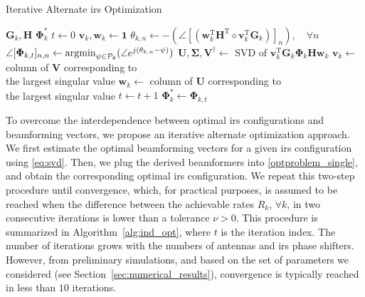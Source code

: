 \begin{algorithm}[t]%
\caption{Iterative Alternate \gls{irs} Optimization}\label{alg:ind_opt}
\begin{algorithmic}[1]%
\Require $\bm{G}_k, \bm{H}$
\Ensure $\bm{\Phi}^*_k$
\State $t\gets 0$
\State $\bm{v}_k, \bm{w}_k \gets \bm{1}$
\Repeat
\State$	\theta_{k, n} \gets -(\angle\left[\left(\bm{w}_k^{\mathrm T}\bm{H}^{\mathrm T}\diamond\bm{v}_k^{\mathrm T}\bm{G}_k\right)\right]_{n}), \quad \forall n$
\State$\angle[\bm{\Phi}_{k, t}]_{n,n} \gets \operatorname*{\arg\!\min}_{\substack{\psi \in \mathcal{P}_{\theta}}}(\angle e^{j(\theta_{k, n}-\psi)})$
\State$\bm{U}, \bm{\Sigma}, \bm{V}^\dagger \gets$  SVD  of $\bm{v}_k^{\mathrm T}\bm{G}_k \bm{\Phi}_k \bm{H}\bm{w}_k $
\State$\bm{v}_k \gets$ column of $\bm{V}$ corresponding to \\\quad\quad the largest singular value
\State$\bm{w}_k \gets$ column of $\bm{U}$ corresponding to \\\quad\quad the largest singular value
\State$t \gets t+1$
\State $\bm{\Phi}^*_k \gets \bm{\Phi}_{k,t}$
\end{algorithmic}\normalsize
\end{algorithm}

To overcome the interdependence between optimal \gls{irs} configurations and beamforming vectors, we propose an iterative alternate optimization approach. We first estimate the optimal beamforming vectors for a given \gls{irs} configuration using \eqref{eq:svd}. Then, we plug the derived beamformers into \eqref{optproblem_single}, and obtain the corresponding optimal \gls{irs} configuration. We repeat this two-step procedure until convergence, which, for practical purposes, is assumed to be reached when the difference between the achievable rates $R_k$, $\forall k$, in two consecutive iterations is lower than a tolerance $\nu>0$. 
This procedure is summarized in Algorithm~\ref{alg:ind_opt}, where $t$ is the iteration index. The number of iterations grows with the numbers of antennas and \gls{irs} phase shifters. However, from preliminary simulations, and based on the set of parameters we considered (see Section~\ref{sec:numerical_results}), convergence is typically reached in less than $10$ iterations.


